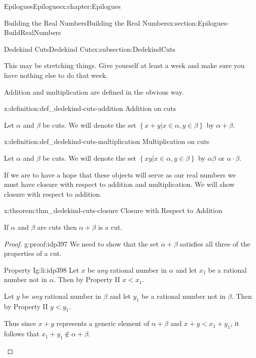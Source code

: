 \begin{chapterptx}{Epilogues}{}{Epilogues}{}{}{x:chapter:Epilogues}
\begin{sectionptx}{Building the Real Numbers}{}{Building the Real Numbers}{}{}{x:section:Epilogues-BuildRealNumbers}
\begin{subsectionptx}{Dedekind Cuts}{}{Dedekind Cuts}{}{}{x:subsection:DedekindCuts}
\begin{quote}
			\end{quote}
			This may be stretching things. Give yourself at least a week and make sure you have nothing else to do that week.%
			\par
			Addition and multiplication are defined in the obvious way.%
			\begin{definition}{}{x:definition:def_dedekind-cuts-addition}%
				\alert{Addition on cuts}%
				\par
				 Let \(\alpha\) and \(\beta\) be cuts. We will denote the set \(\left\{x+y|x\in\alpha,
				y\in\beta\right\}\) by \(\alpha+\beta\).%
			\end{definition}
			\begin{definition}{}{x:definition:def_dedekind-cuts-multiplication}%
				\alert{Multiplication on cuts}%
				\par
				 Let \(\alpha\) and \(\beta\) be cuts. We will denote the set \(\left\{xy|x\in\alpha,
				y\in\beta\right\}\) by \(\alpha\beta \text{ or } \alpha\cdot\beta\).%
			\end{definition}
			If we are to have a hope that these objects will serve as our real numbers we must have closure with respect to addition and multiplication. We will show closure with respect to addition.%
			\begin{theorem}{}{}{x:theorem:thm_dedekind-cuts-closure}%
				\alert{Closure with Respect to Addition}%
				\par
				 If \(\alpha\) and \(\beta\) are cuts then \(\alpha+\beta\) is a cut.%
			\end{theorem}
			\begin{proof}{}{g:proof:idp397}
				We need to show that the set \(\alpha+\beta\) satisfies all three of the properties of a cut.%
				\par
				\begin{descriptionlist}
					\begin{dlimedium}{Property I}{g:li:idp398}%
						Let \(x\) be \emph{any} rational number in \(\alpha\) and let \(x_1\) be a rational number not in \(\alpha\).  Then by Property II \(x\lt x_1\).%
						\par
						Let \(y\) be \emph{any} rational number in \(\beta\) and let \(y_1\) be a rational number not in \(\beta\).  Then by Property II \(y\lt
						y_1\).%
						\par
						Thus since \(x+y\) represents a generic element of \(\alpha+\beta\) and \(x+y\lt x_1+y_1\), it follows that \(x_1+y_1\not\in\alpha+\beta\).%

\end{dlimedium}
\end{descriptionlist}
\end{proof}
\end{subsectionptx}
\end{sectionptx}
\end{chapterptx}
